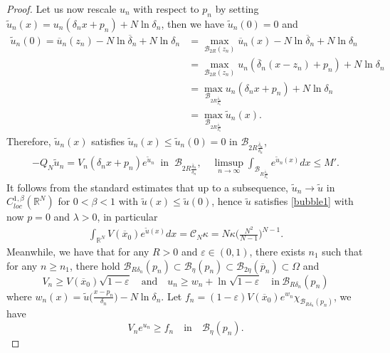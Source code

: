 \documentclass[11pt]{amsart}
\numberwithin{equation}{section}
\newcommand\cc{\mathcal{C}}
\begin{document}
\begin{proof}
Let us now rescale $u_n$ with respect to $p_n$ by setting $\widetilde{u}_{n}(x)=u_{n}(\delta_{n}x+p_n)+N\ln\delta_{n}$, then we have $\widetilde{u}_{n}(0)=0$ and
\begin{align*}
\widetilde{u}_{n}(0) =\overline{u}_{n}(z_{n})-N\ln\overline{\delta}_{n}+N\ln\delta_{n} &=\max_{\mathcal{B}_{2R}(z_{n})}\overline{u}_{n}(x)-N\ln\overline{\delta}_{n}+N\ln\delta_{n}\\
&=\max_{\mathcal{B}_{2R}(z_n)}u_{n}(\overline{\delta}_{n}(x-z_n)+ p_n)+N\ln\delta_{n}\\
&=\max_{\mathcal{B}_{2R\frac{\overline{\delta}_{n}}{\delta_{n}}}}u_{n}(\delta_{n}x+p_n)+N\ln\delta_{n}\\
&=\max_{\mathcal{B}_{2R\frac{\overline{\delta}_{n}}{\delta_{n}}}}\widetilde{u}_{n}(x).
\end{align*}
Therefore, $\widetilde{u}_{n}(x)$ satisfies $\widetilde{u}_{n}(x)\leq \widetilde{u}_{n}(0) =0$ in $ \mathcal{B}_{2R\frac{\overline{\delta}_{n}}{\delta_{n}}}$,
\begin{align}
\label{tilde-un}
-Q_{N}\widetilde{u}_{n} =V_{n}(\delta_{n}x+p_n)e^{\widetilde{u}_{n}}\;\; \mbox{in }~ \mathcal{B}_{2R\frac{\overline{\delta}_{n}}{\delta_{n}}},\quad
\limsup\limits_{n\rightarrow\infty}\int_{\mathcal{B}_{R\frac{\overline{\delta}_{n}}{\delta_{n}}}}e^{\widetilde{u}_n(x)}dx \leq M'.
\end{align}
It follows from the standard estimates that up to a subsequence, $\widetilde{u}_{n} \rightarrow\widetilde{u}$ in $C_{loc}^{1, \beta}(\mathbb{R}^{N})$ for $0<\beta<1$ with $\widetilde{u}(x) \le \widetilde{u}(0)$, hence $\widetilde{u}$ satisfies \eqref{bubble1} with now $p =0$ and $\lambda > 0$, in particular
\begin{align}\label{blow}
\int_{\mathbb{R}^N} V(\overline{x}_{0}) e^{\widetilde{u}(x)}dx = \cc_N\kappa = N\kappa\Big(\frac{N^2}{N-1}\Big)^{N-1}.
\end{align}
Meanwhile, we have that for any $R>0$ and $\varepsilon \in (0, 1)$, there exists $n_1$ such that for any $n \geq n_1$, there hold $\mathcal{B}_{R\delta_{n}}(p_n)\subset \mathcal{B}_{\eta}(p_n)\subset \mathcal{B}_{2\eta}(\overline{p}_{n}) \subset \Omega$ and
$$V_{n}\geq V(\overline{x}_{0})\sqrt{1-\varepsilon}\quad\mbox{and}\quad u_{n}\geq w_n +\ln\sqrt{1-\varepsilon} \quad\mbox{in}~\mathcal{B}_{R\delta_{n}}(p_n)$$
where $w_n(x) = \widetilde u\Big(\frac{x - p_n}{\delta_n}\Big) - N\ln\delta_n.$
Let $f_{n} =(1-\varepsilon)V(\overline{x}_{0})e^{w_n}\chi_{\mathcal{B}_{R\delta_{n}}(p_n)}$, we have $$V_{n}e^{u_{n}}\geq f_{n} \quad\mbox{in}\quad \mathcal{B}_{\eta}(p_n).$$

\end{proof}
\end{document}
